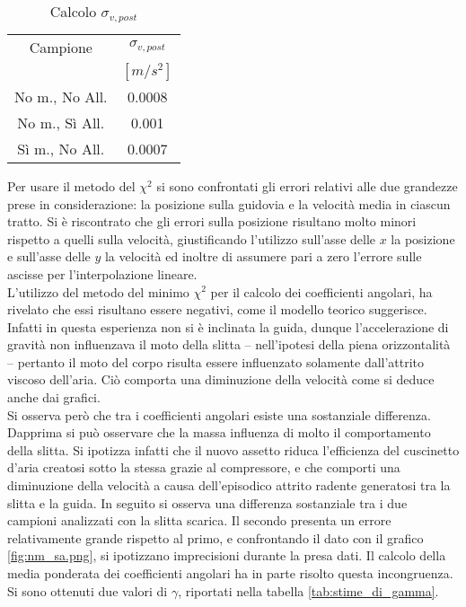 \documentclass[a4paper,11pt,oneside]{article}
\begin{document}
\begin{wraptable}{l}{5cm}%
\centering
    \begin{tabular}{c|c}
        \toprule
        Campione & $\sigma_{v, post}$ \\
        & $[\si{m/s^{2}}]$\\
        \midrule
        No m., No All. &  0.0008\\
        No m., Sì All. & 0.001 \\
        Sì m., No All. & 0.0007 \\
        \bottomrule
    \end{tabular}
    \caption{Calcolo $\sigma_{v, post}$}
    \label{tab:v_post_delta_g}
\end{wraptable}
Per usare il metodo del ${\chi}^{2}$ si sono confrontati gli errori relativi alle due grandezze prese in considerazione: la posizione sulla guidovia e la velocità media in ciascun tratto. Si è riscontrato che gli errori sulla posizione risultano molto minori rispetto a quelli sulla velocità, giustificando l'utilizzo sull'asse delle $x$ la posizione e sull'asse delle $y$ la velocità ed inoltre di assumere pari a zero l'errore sulle ascisse per l'interpolazione lineare.\\
L'utilizzo del metodo del minimo ${\chi}^{2}$ per il calcolo dei coefficienti angolari, ha rivelato che essi risultano essere negativi, come il modello teorico suggerisce. Infatti in questa esperienza non si è inclinata la guida, dunque l'accelerazione di gravità non influenzava il moto della slitta -- nell'ipotesi della piena orizzontalità -- pertanto il moto del corpo risulta essere influenzato solamente dall'attrito viscoso dell'aria. Ciò comporta una diminuzione della velocità come si deduce anche dai grafici.\\
Si osserva però che tra i coefficienti angolari esiste una sostanziale differenza. Dapprima si può osservare che la massa influenza di molto il comportamento della slitta. Si ipotizza infatti che il nuovo assetto riduca l'efficienza del cuscinetto d'aria creatosi sotto la stessa grazie al compressore, e che comporti una diminuzione della velocità a causa dell'episodico attrito radente generatosi tra la slitta e la guida. In seguito si osserva una differenza sostanziale tra i due campioni analizzati con la slitta scarica. Il secondo presenta un errore relativamente grande rispetto al primo, e confrontando il dato con il grafico \ref{fig:nm_sa.png}, si ipotizzano imprecisioni durante la presa dati. Il calcolo della media ponderata dei coefficienti angolari ha in parte risolto questa incongruenza. Si sono ottenuti due valori di $\gamma$, riportati nella tabella \ref{tab:stime_di_gamma}.\\
\end{document}
